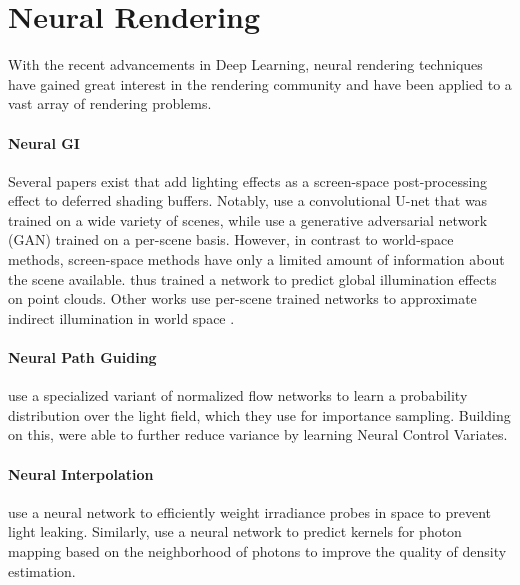 \section{Neural Rendering}
With the recent advancements in Deep Learning, neural rendering techniques have gained great interest in the rendering community and have been applied to a vast array of rendering problems.

\paragraph{Neural GI}
Several papers exist that add lighting effects as a screen-space post-processing effect to deferred shading buffers.
Notably, \textcite{nalbach2017} use a convolutional U-net that was trained on a wide variety of scenes, while \textcite{thomas2018} use a generative adversarial network (GAN) trained on a per-scene basis.
However, in contrast to world-space methods, screen-space methods have only a limited amount of information about the scene available.
\textcite{hermosilla2019} thus trained a network to predict global illumination effects on point clouds.
Other works use per-scene trained networks to approximate indirect illumination in world space \parencite{ren2013}.

\paragraph{Neural Path Guiding}
\textcite{muller2019} use a specialized variant of normalized flow networks to learn a probability distribution over the light field, which they use for importance sampling.
Building on this, \textcite{muller2020} were able to further reduce variance by learning Neural Control Variates.

\paragraph{Neural Interpolation}
\textcite{iwanicki2017} use a neural network to efficiently weight irradiance probes in space to prevent light leaking.
Similarly, \textcite{zhu2020} use a neural network to predict kernels for photon mapping based on the neighborhood of photons to improve the quality of density estimation.

